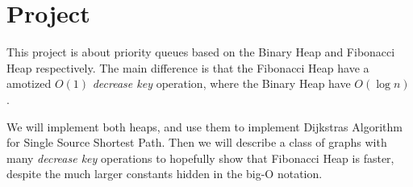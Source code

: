 \section*{Project}
This project is about priority queues based on the Binary Heap and Fibonacci Heap respectively. The main difference is that the Fibonacci Heap have a amotized $O(1)$ \textit{decrease key} operation, where the Binary Heap have $O(\log n)$.

We will implement both heaps, and use them to implement Dijkstras Algorithm for Single Source Shortest Path. Then we will describe a class of graphs with many \textit{decrease key} operations to hopefully show that Fibonacci Heap is faster, despite the much larger constants hidden in the big-O notation.
